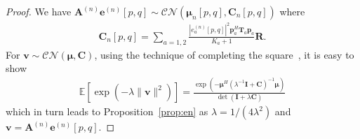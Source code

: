 \documentclass[journal]{IEEEtran}
\begin{document}
\begin{proof}
  We have $\mathbf{A}^{(n)}\mathbf{e}^{(n)}[p,q]
  \sim\mathcal{CN}(\bm{\mu}_n[p,q], \mathbf{C}_n[p,q])$
  where 
  \begin{align}
    \mathbf{C}_n[p,q] = \sum_{a=1,2}
    \frac{|e_a^{(n)}[p,q]|^2\mathbf{p}_a^H\mathbf{T}_a
    \mathbf{p}_a}{K_a+1}\mathbf{R}.
  \end{align}
  For $\mathbf{v}\sim\mathcal{CN}(\bm{\mu}, \mathbf{C})$, using the technique of
  completing the square~\cite[Sec. 2.3.1]{bishop2006pattern}, it is easy to show
  \begin{align}
    \mathbb{E}\left[\exp(-\lambda\|\mathbf{v}\|^2)\right] =
    \frac{\exp\left(-\bm{\mu}^H(\lambda^{-1}\mathbf{I} +
    \mathbf{C})^{-1}\bm{\mu}\right)}{\det(\mathbf{I} +
    \lambda\mathbf{C})} \label{eq:elv2}
  \end{align}
  which in turn leads to Proposition~\ref{prop:en} as $\lambda=1/(4\lambda^2)$
  and $\mathbf{v}=\mathbf{A}^{(n)}\mathbf{e}^{(n)}[p,q]$.
\end{proof}
\end{document}
